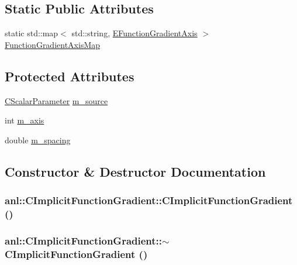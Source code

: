 \subsection*{Static Public Attributes}
\begin{DoxyCompactItemize}
\item 
static std::map$<$ std::string, \hyperlink{namespaceanl_ab5402e3a50061a6adbf9dce74bfd2c66}{EFunctionGradientAxis} $>$ \hyperlink{classanl_1_1CImplicitFunctionGradient_a6b1075c325651c7a4f9803c2eb18ae09}{FunctionGradientAxisMap}
\end{DoxyCompactItemize}
\subsection*{Protected Attributes}
\begin{DoxyCompactItemize}
\item 
\hyperlink{classanl_1_1CScalarParameter}{CScalarParameter} \hyperlink{classanl_1_1CImplicitFunctionGradient_a13b46a71cb6454ac806b82a104acf7b2}{m\_\-source}
\item 
int \hyperlink{classanl_1_1CImplicitFunctionGradient_a083f61a863fe96c228a297c4056dd55d}{m\_\-axis}
\item 
double \hyperlink{classanl_1_1CImplicitFunctionGradient_a527780ba24450fedce559f2e791ed647}{m\_\-spacing}
\end{DoxyCompactItemize}


\subsection{Constructor \& Destructor Documentation}
\hypertarget{classanl_1_1CImplicitFunctionGradient_a5a4a8b102526ac04409f0d0f3ccb3663}{
\subsubsection[{CImplicitFunctionGradient}]{\setlength{\rightskip}{0pt plus 5cm}anl::CImplicitFunctionGradient::CImplicitFunctionGradient ()}}
\label{classanl_1_1CImplicitFunctionGradient_a5a4a8b102526ac04409f0d0f3ccb3663}
\hypertarget{classanl_1_1CImplicitFunctionGradient_a9b620a6f91cadb8aa6df7928d12eb21a}{
\subsubsection[{$\sim$CImplicitFunctionGradient}]{\setlength{\rightskip}{0pt plus 5cm}anl::CImplicitFunctionGradient::$\sim$CImplicitFunctionGradient ()}}
\label{classanl_1_1CImplicitFunctionGradient_a9b620a6f91cadb8aa6df7928d12eb21a}



